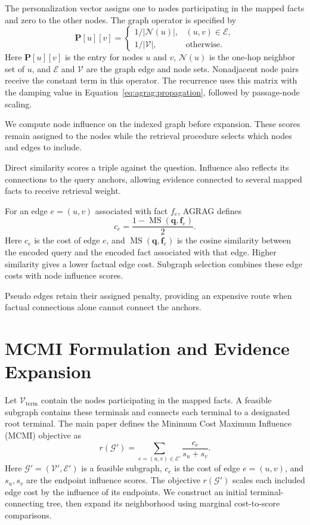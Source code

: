 The personalization vector assigns one to nodes participating in the mapped facts and zero to the other nodes. The graph operator is specified by
\begin{equation}
\mathbf{P}[u][v]=
\begin{cases}
1/|\mathcal{N}(u)|,&(u,v)\in\mathcal{E},\\
1/|\mathcal{V}|,&\text{otherwise}.
\end{cases}
\label{eq:agrag:graph-operator}
\end{equation}
Here $\mathbf P[u][v]$ is the entry for nodes $u$ and $v$, $\mathcal N(u)$ is the one-hop neighbor set of $u$, and $\mathcal E$ and $\mathcal V$ are the graph edge and node sets. Nonadjacent node pairs receive the constant term in this operator. The recurrence uses this matrix with the damping value in Equation~\ref{eq:agrag:propagation}, followed by passage-node scaling.

We compute node influence on the indexed graph before expansion. These scores remain assigned to the nodes while the retrieval procedure selects which nodes and edges to include.

Direct similarity scores a triple against the question. Influence also reflects its connections to the query anchors, allowing evidence connected to several mapped facts to receive retrieval weight.

For an edge $e=(u,v)$ associated with fact $f_e$, AGRAG defines
\begin{equation}
c_e=\frac{1-\operatorname{MS}(\mathbf{q},\mathbf{f}_e)}{2}.
\label{eq:agrag:edge-cost}
\end{equation}
Here $c_e$ is the cost of edge $e$, and $\operatorname{MS}(\mathbf q,\mathbf f_e)$ is the cosine similarity between the encoded query and the encoded fact associated with that edge. Higher similarity gives a lower factual edge cost. Subgraph selection combines these edge costs with node influence scores.

Pseudo edges retain their assigned penalty, providing an expensive route when factual connections alone cannot connect the anchors.

\section{MCMI Formulation and Evidence Expansion}
\label{sec:agrag:mcmi}
Let $\mathcal{V}_{\mathrm{term}}$ contain the nodes participating in the mapped facts. A feasible subgraph contains these terminals and connects each terminal to a designated root terminal. The main paper defines the Minimum Cost Maximum Influence (MCMI) objective as
\begin{equation}
r(\mathcal{G}')=\sum_{e=(u,v)\in\mathcal{E}'}
\frac{c_e}{s_u+s_v}.
\label{eq:agrag:mcmi-objective}
\end{equation}
Here $\mathcal G'=(\mathcal V',\mathcal E')$ is a feasible subgraph, $c_e$ is the cost of edge $e=(u,v)$, and $s_u,s_v$ are the endpoint influence scores. The objective $r(\mathcal G')$ scales each included edge cost by the influence of its endpoints. We construct an initial terminal-connecting tree, then expand its neighborhood using marginal cost-to-score comparisons.

